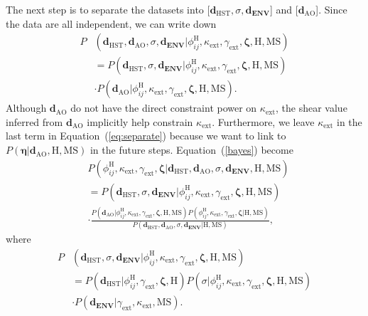 \documentclass[useAMS,usenatbib]{mnras}
\newcommand{\eref}[1]{Equation~(\ref{#1})}
\begin{document}
The next step is to separate the datasets into [$\bm{d}_{\textrm{HST}},\sigma, \bm{d_{\textrm{ENV}}}$] and [$\bm{d}_{\textrm{AO}}$]. Since the data are all independent, we can write down
\begin{equation}
\label{eq:separate}
    \begin{split}
        P&(\bm{d}_{\textrm{HST}},\bm{d}_{\textrm{AO}},\sigma, \bm{d_{\textrm{ENV}}}|\phi_{ij}^{\textrm{H}},\kappa_{\textrm{ext}},\gamma_{\textrm{ext}},\bm{\zeta},\textrm{H},\textrm{MS})\\
        &=P(\bm{d}_{\textrm{HST}},\sigma, \bm{d_{\textrm{ENV}}}|\phi_{ij}^{\textrm{H}},\kappa_{\textrm{ext}},\gamma_{\textrm{ext}},\bm{\zeta},\textrm{H},\textrm{MS})\\
        &\cdot P(\bm{d}_{\textrm{AO}}|\phi_{ij}^{\textrm{H}},\kappa_{\textrm{ext}},\gamma_{\textrm{ext}},\bm{\zeta},\textrm{H},\textrm{MS}).
    \end{split}
\end{equation}
Although $\bm{d}_{\textrm{AO}}$ do not have the direct constraint power on $\kappa_{\textrm{ext}}$, the shear value inferred from $\bm{d}_{\textrm{AO}}$ implicitly help constrain $\kappa_{\textrm{ext}}$. Furthermore, we leave $\kappa_{\textrm{ext}}$ in the last term in \eref{eq:separate} because we want to link to $P(\bm{\eta}|\bm{d}_{\textrm{AO}},\textrm{H},\textrm{MS})$ in the future steps. 
\eref{bayes} become
\begin{equation}
\label{inde}
\begin{split}
    &P(\phi_{ij}^{\textrm{H}},\kappa_{\textrm{ext}},\gamma_{\textrm{ext}},\bm{\zeta}|\bm{d}_{\textrm{HST}},\bm{d}_{\textrm{AO}},\sigma, \bm{d_{\textrm{ENV}}},\textrm{H},\textrm{MS})\\
   &=P(\bm{d}_{\textrm{HST}},\sigma, \bm{d_{\textrm{ENV}}}|\phi_{ij}^{\textrm{H}},\kappa_{\textrm{ext}},\gamma_{\textrm{ext}},\bm{\zeta},\textrm{H},\textrm{MS})\\ &\cdot\frac{P(\bm{d}_{\textrm{AO}}|\phi_{ij}^{\textrm{H}},\kappa_{\textrm{ext}},\gamma_{\textrm{ext}},\bm{\zeta},\textrm{H},\textrm{MS})P(\phi_{ij}^{\textrm{H}},\kappa_{\textrm{ext}},\gamma_{\textrm{ext}},\bm{\zeta}|\textrm{H},\textrm{MS})}{P(\bm{d}_{\textrm{HST}},\bm{d}_{\textrm{AO}},\sigma, \bm{d_{\textrm{ENV}}}|\textrm{H},\textrm{MS})},
\end{split}
\end{equation}
where
\begin{equation}
\label{eqe}
\begin{split}
    P&(\bm{d}_{\textrm{HST}},\sigma, \bm{d_{\textrm{ENV}}}|\phi_{ij}^{\textrm{H}},\kappa_{\textrm{ext}},\gamma_{\textrm{ext}},\bm{\zeta},\textrm{H},\textrm{MS})\\
    &=P(\bm{d}_{\textrm{HST}}|\phi_{ij}^{\textrm{H}},\gamma_{\textrm{ext}},\bm{\zeta},\textrm{H})P(\sigma|\phi_{ij}^{\textrm{H}},\kappa_{\textrm{ext}},\gamma_{\textrm{ext}},\bm{\zeta},\textrm{H},\textrm{MS})\\
    &\cdot P(\bm{d_{\textrm{ENV}}}|\gamma_{\textrm{ext}},\kappa_{\textrm{ext}},\textrm{MS}).
\end{split}
\end{equation}
\end{document}
